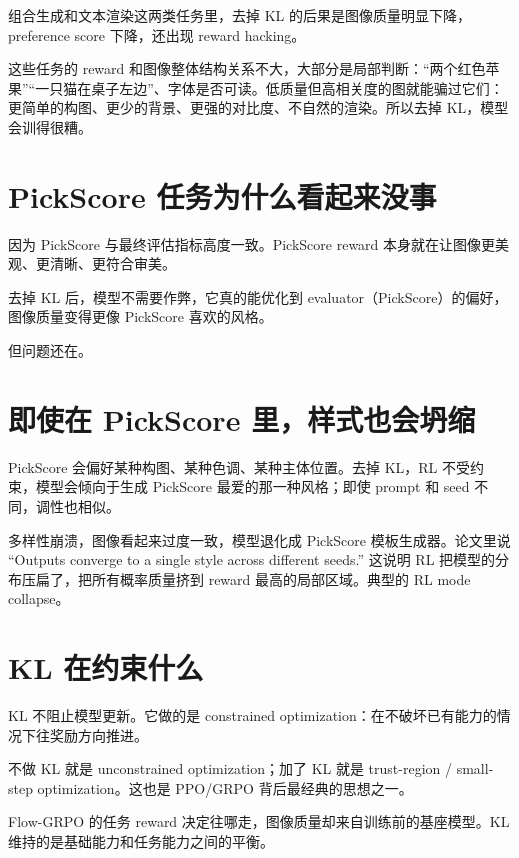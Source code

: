 组合生成和文本渲染这两类任务里，去掉 KL 的后果是图像质量明显下降，preference score 下降，还出现 reward hacking。

这些任务的 reward 和图像整体结构关系不大，大部分是局部判断：“两个红色苹果”“一只猫在桌子左边”、字体是否可读。低质量但高相关度的图就能骗过它们：更简单的构图、更少的背景、更强的对比度、不自然的渲染。所以去掉 KL，模型会训得很糟。

\section{PickScore 任务为什么看起来没事}

因为 PickScore 与最终评估指标高度一致。PickScore reward 本身就在让图像更美观、更清晰、更符合审美。

去掉 KL 后，模型不需要作弊，它真的能优化到 evaluator（PickScore）的偏好，图像质量变得更像 PickScore 喜欢的风格。

但问题还在。

\section{即使在 PickScore 里，样式也会坍缩}

PickScore 会偏好某种构图、某种色调、某种主体位置。去掉 KL，RL 不受约束，模型会倾向于生成 PickScore 最爱的那一种风格；即使 prompt 和 seed 不同，调性也相似。

多样性崩溃，图像看起来过度一致，模型退化成 PickScore 模板生成器。论文里说 “Outputs converge to a single style across different seeds.” 这说明 RL 把模型的分布压扁了，把所有概率质量挤到 reward 最高的局部区域。典型的 RL mode collapse。

\section{KL 在约束什么}

KL 不阻止模型更新。它做的是 constrained optimization：在不破坏已有能力的情况下往奖励方向推进。

不做 KL 就是 unconstrained optimization；加了 KL 就是 trust-region / small-step optimization。这也是 PPO/GRPO 背后最经典的思想之一。

Flow-GRPO 的任务 reward 决定往哪走，图像质量却来自训练前的基座模型。KL 维持的是基础能力和任务能力之间的平衡。
